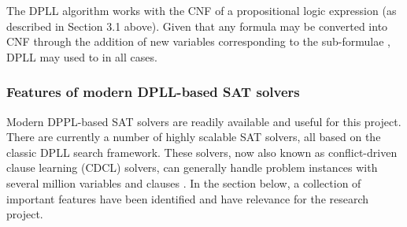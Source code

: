 \documentclass[11pt, a4paper, oneside]{report} %
\begin{document}
The DPLL algorithm works with the CNF of a propositional logic expression (as
described in Section 3.1 above). Given that any formula may be converted into
CNF through the addition of new variables corresponding to the sub-formulae
\cite{tseitin1983complexity,Goldreich:2008}, DPLL may used to in all cases.


\subsubsection{Features of modern DPLL-based SAT solvers}

Modern DPPL-based SAT solvers are readily available and useful for this project.
There are currently a number of highly scalable SAT solvers, all based on the
classic DPLL search framework. These solvers, now also known as conflict-driven
clause learning (CDCL) solvers, can generally handle problem instances with
several million variables and clauses \cite{katebi2011empirical}. In the section
below, a collection of important features have been identified and have
relevance for the research project.
\end{document}
